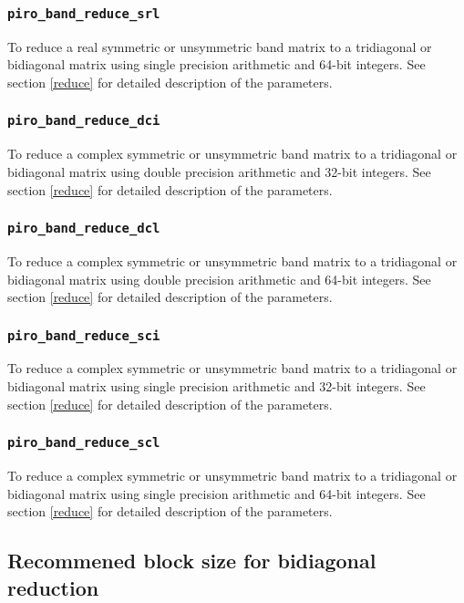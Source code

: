 \documentclass[11pt]{article}
\begin{document}
\subsubsection{{\tt piro\_band\_reduce\_srl}}

To reduce a real symmetric or unsymmetric band matrix to a
tridiagonal or bidiagonal matrix using single precision arithmetic and 64-bit
integers. See section \ref{reduce} for detailed description of the parameters.

\subsubsection{{\tt piro\_band\_reduce\_dci}}

To reduce a complex symmetric or unsymmetric band matrix to a
tridiagonal or bidiagonal matrix using double precision arithmetic and 
32-bit integers. See section \ref{reduce} for detailed description of the parameters.

\subsubsection{{\tt piro\_band\_reduce\_dcl}}

To reduce a complex symmetric or unsymmetric band matrix to a
tridiagonal or bidiagonal matrix using double precision arithmetic and 64-bit
integers. See section \ref{reduce} for detailed description of the parameters.

\subsubsection{{\tt piro\_band\_reduce\_sci}}

To reduce a complex symmetric or unsymmetric band matrix to a
tridiagonal or bidiagonal matrix using single precision arithmetic and 
32-bit integers. See section \ref{reduce} for detailed description of the parameters.

\subsubsection{{\tt piro\_band\_reduce\_scl}}

To reduce a complex symmetric or unsymmetric band matrix to a
tridiagonal or bidiagonal matrix using single precision arithmetic and 64-bit
integers. See section \ref{reduce} for detailed description of the parameters.

\subsection{Recommened block size for bidiagonal reduction}
\end{document}
